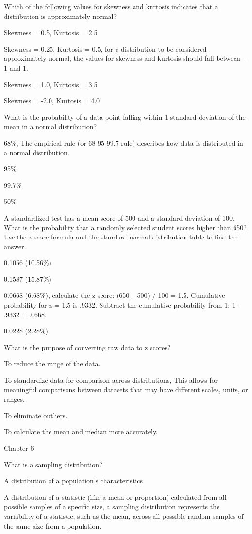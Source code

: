 \documentclass[
  letterpaper,
  DIV=11,
  numbers=noendperiod]{scrreprt}
\begin{document}
Which of the following values for skewness and kurtosis indicates that a
distribution is approximately normal?

Skewness = 0.5, Kurtosis = 2.5

Skewness = 0.25, Kurtosis = 0.5, for a distribution to be considered
approximately normal, the values for skewness and kurtosis should fall
between -- 1 and 1.

Skewness = 1.0, Kurtosis = 3.5

Skewness = -2.0, Kurtosis = 4.0

What is the probability of a data point falling within 1 standard
deviation of the mean in a normal distribution?

68\%, The empirical rule (or 68-95-99.7 rule) describes how data is
distributed in a normal distribution.

95\%

99.7\%

50\%

A standardized test has a mean score of 500 and a standard deviation of
100. What is the probability that a randomly selected student scores
higher than 650? Use the z score formula and the standard normal
distribution table to find the answer.

0.1056 (10.56\%)

0.1587 (15.87\%)

0.0668 (6.68\%), calculate the z score: (650 -- 500) / 100 = 1.5.
Cumulative probability for z = 1.5 is .9332. Subtract the cumulative
probability from 1: 1 - .9332 = .0668.

0.0228 (2.28\%)

What is the purpose of converting raw data to z scores?

To reduce the range of the data.

To standardize data for comparison across distributions, This allows for
meaningful comparisons between datasets that may have different scales,
units, or ranges.

To eliminate outliers.

To calculate the mean and median more accurately.

Chapter 6

What is a sampling distribution?

A distribution of a population's characteristics

A distribution of a statistic (like a mean or proportion) calculated
from all possible samples of a specific size, a sampling distribution
represents the variability of a statistic, such as the mean, across all
possible random samples of the same size from a population.
\end{document}
